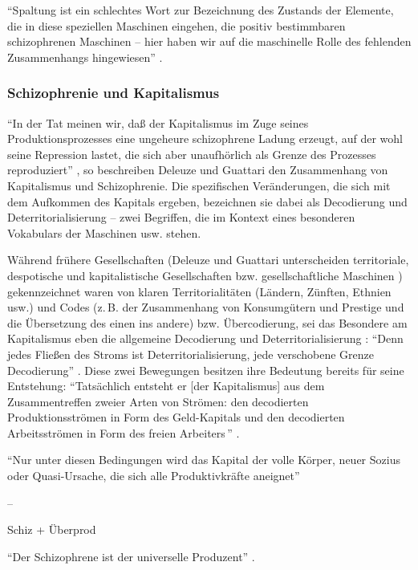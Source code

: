 \documentclass[12pt,
               DIV13,
               paper=a4,
               twoside=false,
               onehalfspacing,
               bibliography=totoc,
               toc=graduated,
               draft,
               ]{scrartcl}
\newcommand{\pc}[2]{\parencite[#1]{#2}}
\newcommand{\vgl}[2]{\parencite[vgl.][#1]{#2}}
\newcommand{\worries}[1]{\ifdraft{\textcolor{blue}{\texttt{(#1)}}}{}}
\begin{document}
"`Spaltung ist ein schlechtes Wort zur Bezeichnung des Zustands der
Elemente, die in diese speziellen Maschinen eingehen, die positiv
bestimmbaren schizophrenen Maschinen -- hier haben wir auf die
maschinelle Rolle des fehlenden Zusammenhangs hingewiesen"'
\pc{27}{schizg}.

\subsubsection{Schizophrenie und Kapitalismus}

"`In der Tat meinen wir, daß der Kapitalismus im Zuge seines
Produktionsprozesses eine ungeheure schizophrene Ladung erzeugt, auf
der wohl seine Repression lastet, die sich aber unaufhörlich als
Grenze des Prozesses reproduziert"' \pc{45}{ao}, so beschreiben
Deleuze und Guattari den Zusammenhang von Kapitalismus und
Schizophrenie. Die spezifischen Veränderungen, die sich mit dem
Aufkommen des Kapitals ergeben, bezeichnen sie dabei als Decodierung
und Deterritorialisierung -- zwei Begriffen, die im Kontext eines
besonderen Vokabulars der Maschinen usw. \worries{?} stehen.

Während frühere Gesellschaften (Deleuze und Guattari unterscheiden
territoriale, despotische und kapitalistische Gesellschaften bzw.
gesellschaftliche Maschinen \vgl{338}{ao}) gekennzeichnet waren von
klaren Territorialitäten (Ländern, Zünften, Ethnien usw.) und Codes
(z.\,B. der Zusammenhang von Konsumgütern und Prestige und die
Übersetzung des einen ins andere) \vgl{318, 332}{ao} bzw.
Übercodierung, sei das Besondere am Kapitalismus eben die allgemeine
Decodierung und Deterritorialisierung \vgl{337}{ao}: "`Denn jedes
Fließen des Stroms ist Deterritorialisierung, jede verschobene Grenze
Decodierung"' \pc{298}{ao}. Diese zwei Bewegungen besitzen ihre Bedeutung
bereits für seine Entstehung: "`Tatsächlich entsteht er [der
Kapitalismus] aus dem Zusammentreffen zweier Arten von Strömen: den
decodierten Produktionsströmen in Form des Geld-Kapitals und den
decodierten Arbeitsströmen in Form des \glq freien Arbeiters\grq\,"'
\pc{44}{ao}.

\worries{Mehr: Organloser voller Körper usw.}

"`Nur unter diesen Bedingungen wird das Kapital der volle Körper,
neuer Sozius oder Quasi-Ursache, die sich alle Produktivkräfte
aneignet"' \pc{292}{ao}

--

Schiz + Überprod

"`Der Schizophrene ist der universelle Produzent"' \pc{13}{ao}.
\end{document}
